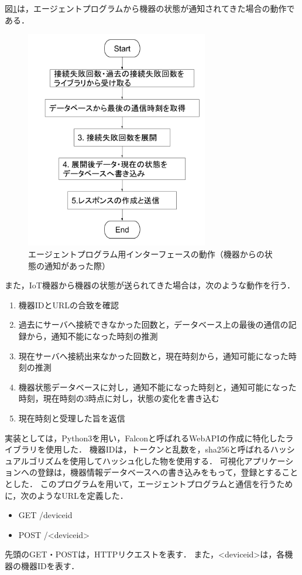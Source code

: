 図\ref{fig:interface_flowB}は，エージェントプログラムから機器の状態が通知されてきた場合の動作である．
\begin{figure}[htbp]
\begin{center}
\includegraphics[width=8cm]{images/interface_flow2.png}
\caption{エージェントプログラム用インターフェースの動作（機器からの状態の通知があった際）}
\label{fig:interface_flowB}
\end{center}
\end{figure}

また，IoT機器から機器の状態が送られてきた場合は，次のような動作を行う．
\begin{enumerate}
\item 機器IDとURLの合致を確認
\item 過去にサーバへ接続できなかった回数と，データベース上の最後の通信の記録から，通知不能になった時刻の推測
\item 現在サーバへ接続出来なかった回数と，現在時刻から，通知可能になった時刻の推測
\item 機器状態データベースに対し，通知不能になった時刻と，通知可能になった時刻，現在時刻の3時点に対し，状態の変化を書き込む
\item 現在時刻と受理した旨を返信
\end{enumerate}

実装としては，Python3を用い，Falconと呼ばれるWebAPIの作成に特化したライブラリを使用した．
機器IDは，トークンと乱数を，sha256と呼ばれるハッシュアルゴリズムを使用してハッシュ化した物を使用する．
可視化アプリケーションへの登録は，機器情報データベースへの書き込みをもって，登録とすることとした．
このプログラムを用いて，エージェントプログラムと通信を行うために，次のようなURLを定義した．
\begin{itemize}
	\item GET /deviceid
	\item POST /<deviceid>
\end{itemize}
先頭のGET・POSTは，HTTPリクエストを表す．
また，<deviceid>は，各機器の機器IDを表す．

